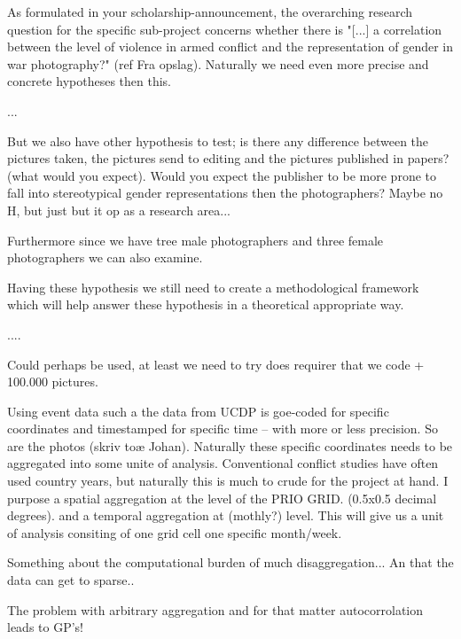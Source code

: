\documentclass[a4paper]{article}
\begin{document}
As formulated in your scholarship-announcement, the overarching research question for the specific sub-project concerns whether there is "[...] a correlation between the level of violence in armed conflict and the representation of gender in war photography?" (ref Fra opslag). Naturally we need even more precise and concrete hypotheses then this.\par %


... \par

But we also have other hypothesis to test; is there any difference between the pictures taken, the pictures send to editing and the pictures published in papers? (what would you expect). Would you expect the publisher to be more prone to fall into stereotypical gender representations then the photographers? Maybe no H, but just but it op as a research area...

Furthermore since we have tree male photographers and three female photographers we can also examine. 

Having these hypothesis we still need to create a methodological framework which will help answer these hypothesis in a theoretical appropriate way.

....

Could perhaps be used, at least we need to try does requirer that we code + 100.000 pictures.

Using event data such a the data from UCDP is goe-coded for specific coordinates and timestamped for specific time -- with more or less precision. So are the photos (skriv toæ Johan). Naturally these specific coordinates needs to be aggregated into some unite of analysis. Conventional conflict studies have often used country years, but naturally this is much to crude for the project at hand. I purpose a spatial aggregation at the level of the PRIO GRID. (0.5x0.5 decimal degrees). and a temporal aggregation at (mothly?) level. This will give us a unit of analysis consiting of one grid cell one specific month/week. 

Something about the computational burden of much disaggregation... An that the data can get to sparse..

The problem with arbitrary aggregation and for that matter autocorrolation leads to GP's!
\end{document}
